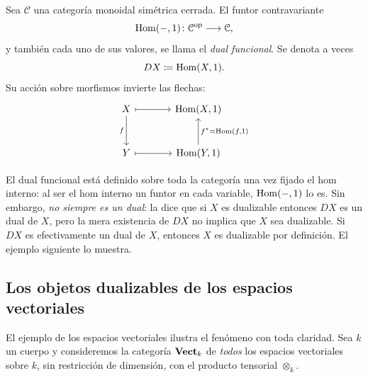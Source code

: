 \begin{defi}\label{defi:dual-funcional}
Sea $\mathcal C$ una categoría monoidal simétrica cerrada. El funtor contravariante
\[
\operatorname{Hom}(-,1)\colon\mathcal C^{\mathrm{op}}\longrightarrow\mathcal C,
\]
y también cada uno de sus valores, se llama el \emph{dual funcional}. Se denota a veces
\[
DX\coloneqq\operatorname{Hom}(X,1).
\]
Su acción sobre morfismos invierte las flechas:
\[
\begin{tikzcd}[column sep=large,row sep=large]
X \arrow[d,"{f}"'] \arrow[r,mapsto] &\ihom(X,1)\\
Y \arrow[r,mapsto] &\ihom(Y,1) \arrow[u,"{f^*=\ihom(f,1)}"']
\end{tikzcd}
\]
\end{defi}

\begin{nota}
   El dual funcional está definido sobre toda la categoría una vez fijado el hom interno: al ser el hom interno un funtor en cada variable, $\operatorname{Hom}(-,1)$ lo es. Sin embargo, \emph{no siempre es un dual}: la  dice que si $X$ es dualizable entonces $DX$ es un dual de $X$, pero la mera existencia de $DX$ no implica que $X$ sea dualizable. Si $DX$ es efectivamente un dual de $X$, entonces $X$ es dualizable por definición. El ejemplo siguiente lo muestra.
\end{nota}

\subsection{Los objetos dualizables de los espacios vectoriales}

El ejemplo de los espacios vectoriales ilustra el fenómeno con toda claridad. Sea $k$ un cuerpo y consideremos la categoría $\mathbf{Vect}_k$ de \emph{todos} los espacios vectoriales sobre $k$, sin restricción de dimensión, con el producto tensorial $\otimes_k$.


